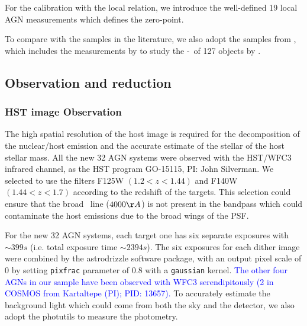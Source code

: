 \documentclass[apj]{emulateapj}
\begin{document}
For the calibration with the local relation, we introduce the well-defined 19 local AGN measurements \citep{Ben++10, Peterson2004} which defines the zero-point. 

To compare with the samples in the literature, we also adopt the samples from \citet{Ding2017b}, which includes the measurements by \citet{Pen++06qsob, Park15} to study the \mbh-\lhost\ of 127 objects by \hst.

\subsection{Observation and reduction}
\label{observation}
\subsubsection{HST image Observation}
The high spatial resolution of the host image is required for the decomposition of the nuclear/host emission and the accurate estimate of the stellar of the host stellar mass. All the new 32 AGN systems were observed with the HST/WFC3 infrared channel, as the HST program GO-15115, PI: John Silverman. We selected to use the filters F125W $(1.2<z<1.44)$ and F140W $(1.44<z<1.7)$ according to the redshift of the targets. This selection could ensure that the broad \halpha\ line ($4000\AA$) is not present in the bandpass which could contaminate the host emissions due to the broad wings of the PSF.

For the new 32 AGN systems, each target one has six separate exposures with $\sim399s$ (i.e. total exposure time $\sim2394s$). The six exposures for each dither image were combined by the {\sc astrodrizzle} software package, with an output pixel scale of 0 by setting \texttt{pixfrac} parameter of 0.8 with a \texttt{gaussian} kernel. \textcolor{blue}{The other four AGNs in our sample have been observed with WFC3 serendipitously (2 in COSMOS from Kartaltepe (PI); PID: 13657).}
To accurately estimate the background light which could come from both the sky and the detector, we also adopt the {\sc photutils} to measure the photometry.

\end{document}
